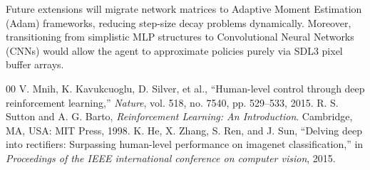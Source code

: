 \documentclass[conference]{IEEEtran}
\begin{document}
Future extensions will migrate network matrices to Adaptive Moment Estimation (Adam) frameworks, reducing step-size decay problems dynamically. Moreover, transitioning from simplistic MLP structures to Convolutional Neural Networks (CNNs) would allow the agent to approximate policies purely via SDL3 pixel buffer arrays.

\begin{thebibliography}{00}
 V. Mnih, K. Kavukcuoglu, D. Silver, et al., ``Human-level control through deep reinforcement learning,'' \textit{Nature}, vol. 518, no. 7540, pp. 529--533, 2015.
 R. S. Sutton and A. G. Barto, \textit{Reinforcement Learning: An Introduction}. Cambridge, MA, USA: MIT Press, 1998.
 K. He, X. Zhang, S. Ren, and J. Sun, ``Delving deep into rectifiers: Surpassing human-level performance on imagenet classification,'' in \textit{Proceedings of the IEEE international conference on computer vision}, 2015.
\end{thebibliography}
\end{document}
